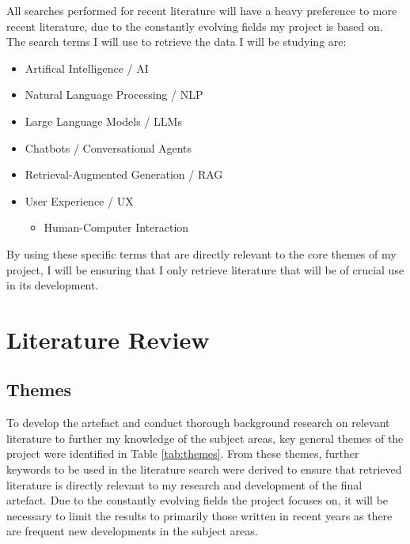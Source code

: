 \documentclass[12pt]{report}
\begin{document}
    \noindent 
    All searches performed for recent literature will have a heavy preference 
    to more recent literature, due to the constantly evolving fields my project is based on. 
    The search terms I will use to retrieve the data I will be studying are:

    \begin{itemize}
        \item Artifical Intelligence / AI 
        \item Natural Language Processing / NLP
        \item Large Language Models / LLMs
        \item Chatbots / Conversational Agents
        \item Retrieval-Augmented Generation / RAG
        
        
        \item User Experience / UX
        \begin{itemize}
            \item Human-Computer Interaction
        \end{itemize}
    \end{itemize}

    \noindent
    By using these specific terms that are directly relevant to the core themes of my project,
    I will be ensuring that I only retrieve literature that will be of crucial use in its 
    development.


    \chapter{Literature Review}

    \section{Themes}

    To develop the artefact and conduct thorough background research on relevant literature to further my 
    knowledge of the subject areas, key general themes of the project were identified in Table \ref{tab:themes}. From these themes, further 
    keywords to be used in the literature search were derived to ensure that retrieved literature is directly relevant 
    to my research and development of the final artefact. Due to the constantly evolving fields the project focuses 
    on, it will be necessary to limit the results to primarily those written in recent years as there are 
    frequent new developments in the subject areas.
\end{document}
